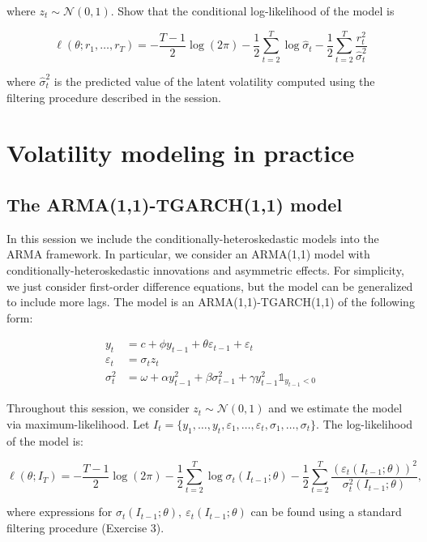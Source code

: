\documentclass[
]{book}
\begin{document}
where \(z_t \sim \mathcal{N}(0, 1)\). Show that the conditional log-likelihood of the model is

\[
\ell(\theta; r_1, \dots, r_T) = -\frac{T-1}{2}\log(2\pi) - \frac{1}{2}\sum_{t=2}^T\log\hat\sigma_t -\frac{1}{2} \sum_{t=2}^T \frac{r_t^2}{\hat\sigma^2_t}
\]

where \(\hat\sigma_t^2\) is the predicted value of the latent volatility computed using the filtering procedure described in the session.

\hypertarget{session07}{%
\chapter{Volatility modeling in practice}\label{session07}}

\hypertarget{the-arma11-tgarch11-model}{%
\section{The ARMA(1,1)-TGARCH(1,1) model}\label{the-arma11-tgarch11-model}}

In this session we include the conditionally-heteroskedastic models into the ARMA framework. In particular, we consider an ARMA(1,1) model with conditionally-heteroskedastic innovations and asymmetric effects. For simplicity, we just consider first-order difference equations, but the model can be generalized to include more lags. The model is an ARMA(1,1)-TGARCH(1,1) of the following form:

\[
\begin{aligned}
y_t &= c + \phi y_{t-1} + \theta \varepsilon_{t-1} + \varepsilon_t \\
\varepsilon_t &= \sigma_t z_t \\
\sigma^2_t &= \omega + \alpha y_{t-1}^2 + \beta \sigma^2_{t-1} + \gamma y_{t-1}^2 \mathbb{1}_{y_{t-1}<0}
\end{aligned}
\]

Throughout this session, we consider \(z_t \sim \mathcal{N}(0,1)\) and we estimate the model via maximum-likelihood. Let \(I_t = \{y_1, \dots, y_t, \varepsilon_1, \dots, \varepsilon_t, \sigma_1, \dots, \sigma_t\}\). The log-likelihood of the model is:

\[
\ell(\theta; I_T) = -\frac{T-1}{2} \log(2\pi) - \frac{1}{2}\sum_{t=2}^T \log \sigma_t(I_{t-1}; \theta) - \frac{1}{2}\sum_{t=2}^T \frac{( \varepsilon_t(I_{t-1}; \theta))^2}{\sigma^2_t(I_{t-1}; \theta)},
\]

where expressions for \(\sigma_t(I_{t-1}; \theta), \ \varepsilon_t(I_{t-1}; \theta)\) can be found using a standard filtering procedure (Exercise 3).
\end{document}
